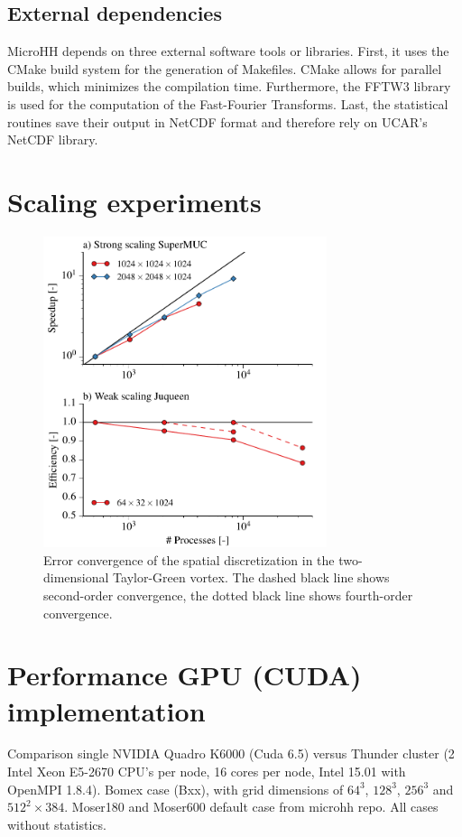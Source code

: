 \documentclass[gmd]{copernicus}
\begin{document}
\subsection{External dependencies}
MicroHH depends on three external software tools or libraries. First, it uses the CMake build system for the generation of Makefiles. CMake allows for parallel builds, which minimizes the compilation time. Furthermore, the FFTW3 library \citep{Frigo2005} is used for the computation of the Fast-Fourier Transforms. Last, the statistical routines save their output in NetCDF format and therefore rely on UCAR's NetCDF library.

\section{Scaling experiments}
\begin{figure}[t]
\vspace*{2mm}
\begin{center}
\includegraphics[width=8.3cm]{figs/scaling.pdf}
\end{center}
\caption{Error convergence of the spatial discretization in the two-dimensional Taylor-Green vortex. The dashed black line shows second-order convergence, the dotted black line shows fourth-order convergence.}
\end{figure}

\section{Performance GPU (CUDA) implementation}

Comparison single NVIDIA Quadro K6000 (Cuda 6.5) versus Thunder cluster (2 Intel Xeon E5-2670 CPU's per node, 16 cores per node, Intel 15.01 with OpenMPI 1.8.4). Bomex case (Bxx), with grid dimensions of $64^3$, $128^3$, $256^3$ and $512^2 \times 384$. Moser180 and Moser600 default case from microhh repo. All cases without statistics. 
\end{document}

